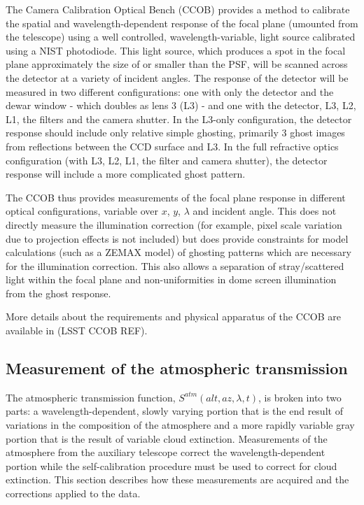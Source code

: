 \documentclass[12pt,preprint]{aastex}
\begin{document}

The Camera Calibration Optical Bench (CCOB) provides a method to
calibrate the spatial and wavelength-dependent response of the focal
plane (umounted from the telescope) using a well controlled,
wavelength-variable, light source calibrated using a NIST
photodiode. This light source, which produces a spot in the focal
plane approximately the size of or smaller than the PSF, will be
scanned across the detector at a variety of incident angles. The
response of the detector will be measured in two different
configurations: one with only the detector and the dewar window -
which doubles as lens 3 (L3) - and one with the detector, L3, L2, L1,
the filters and the camera shutter. In the L3-only configuration, the
detector response should include only relative simple ghosting,
primarily 3 ghost images from reflections between the CCD surface and
L3. In the full refractive optics configuration (with L3, L2, L1, the
filter and camera shutter), the detector response will include a more
complicated ghost pattern.

The CCOB thus provides measurements of the focal plane response in
different optical configurations, variable over $x$, $y$, $\lambda$ and incident
angle. This does not directly measure the illumination
correction (for example, pixel scale variation due to projection
effects is not included) but does provide constraints for model
calculations (such as a ZEMAX model) of ghosting patterns which are
necessary for the illumination correction. This also allows a
separation of stray/scattered light within the focal plane and
non-uniformities in dome screen illumination from the ghost response.

More details about the requirements and physical apparatus of the CCOB
are available in (LSST CCOB REF).

\subsection{Measurement of the atmospheric transmission} 

The atmospheric transmission function, $S^{atm}(alt,az,\lambda,t)$, is
broken into two parts: a wavelength-dependent, slowly varying portion
that is the end result of variations in the composition of the
atmosphere and a more rapidly variable gray portion that is the result
of variable cloud extinction. Measurements of the atmosphere from the
auxiliary telescope correct the wavelength-dependent portion while the
self-calibration procedure must be used to correct for cloud
extinction. This section describes how these measurements are acquired
and the corrections applied to the data.
\end{document}

